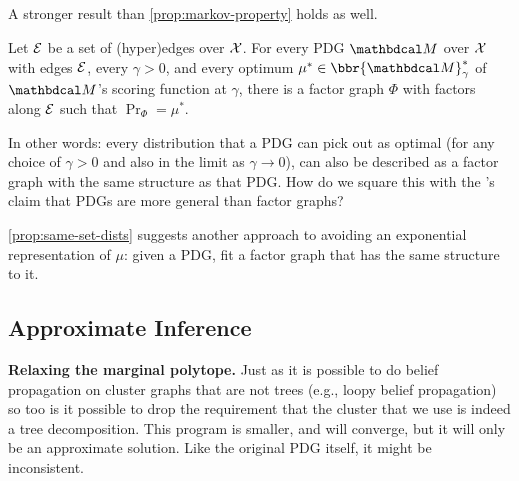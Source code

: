 \documentclass[twoside]{article}
\begin{document}
\subsection{}
A stronger result than \cref{prop:markov-property} holds as well.
\begin{prop}\label{prop:same-set-dists}
    Let $\mathcal E$ be a set of (hyper)edges over $\mathcal X$.
    For every PDG $\dg M$ over $\mathcal X$ with edges $\mathcal E$, every $\gamma > 0$, and every optimum $\mu^* \in \bbr{\dg M}_\gamma^*$ of $\dg M$'s scoring function at $\gamma$,
    there is a factor graph $\Phi$ with factors along $\mathcal E$ such that $\Pr_\Phi = \mu^*$.
\end{prop}

In other words: every distribution that a PDG can pick out as optimal (for any choice of $\gamma > 0$ and also in the limit as $\gamma \to 0$), can also be described as a factor graph with the same structure as that PDG.
How do we square this with the \citeauthor{pdg-aaai}'s claim that PDGs are more general than factor graphs?



\cref{prop:same-set-dists} suggests another approach to avoiding an exponential representation of $\mu$: given a PDG, fit a factor graph that has the same structure to it.

\subsection{Approximate Inference}
\textbf{Relaxing the marginal polytope.}
Just as it is possible to do belief propagation on cluster graphs that are not trees (e.g., loopy belief propagation)
so too is it possible to drop the requirement that the cluster that we use is indeed a tree decomposition.
This program is smaller, and will converge, but it will only be an approximate solution.
Like the original PDG itself, it might be inconsistent.
\end{document}
